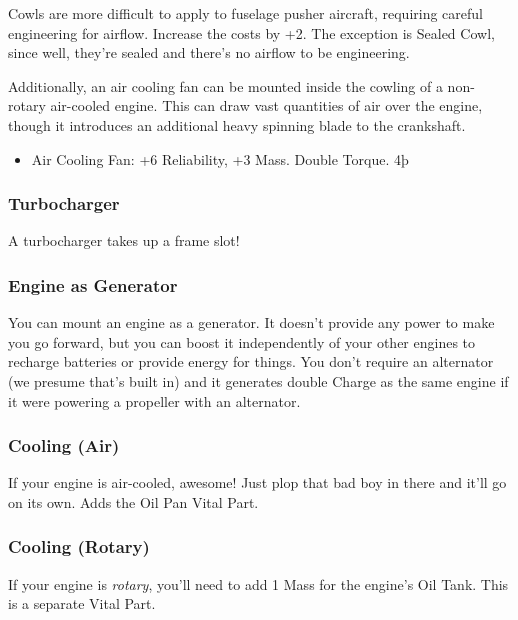\documentclass{article}
\begin{document}
Cowls are more difficult to apply to fuselage pusher aircraft,
requiring careful engineering for airflow. Increase the costs by +2.
The exception is Sealed Cowl, since well, they're sealed and there's no airflow
to be engineering.

Additionally, an air cooling fan can be mounted inside the
cowling of a non-rotary air-cooled engine. This can draw vast quantities
of air over the engine, though it introduces an additional heavy
spinning blade to the crankshaft.

\begin{itemize}
    \item          Air Cooling Fan: +6 Reliability, +3 Mass. Double Torque. 4þ
\end{itemize}

\subsubsection{Turbocharger}
\label{_Turbocharger}

A turbocharger takes up a frame slot!

\subsubsection{Engine as Generator}
\label{Engine_as_Generator}

You can mount an engine as a generator. It doesn't provide any power to
make you go forward, but you can boost it independently of your other
engines to recharge batteries or provide energy for things. You don't
require an alternator (we presume that's built in) and it generates
double Charge as the same engine if it were powering a propeller with an
alternator.

\subsubsection{Cooling (Air)}
\label{_Cooling_(Air)}

If your engine is air-cooled, awesome! Just plop that bad boy in there
and it'll go on its own. Adds the Oil Pan Vital Part.

\subsubsection{Cooling (Rotary)}
\label{_Cooling_(Rotary)}

If your engine is \emph{rotary}, you'll need to add 1 Mass for the
engine's Oil Tank. This is a separate Vital Part.
\end{document}
